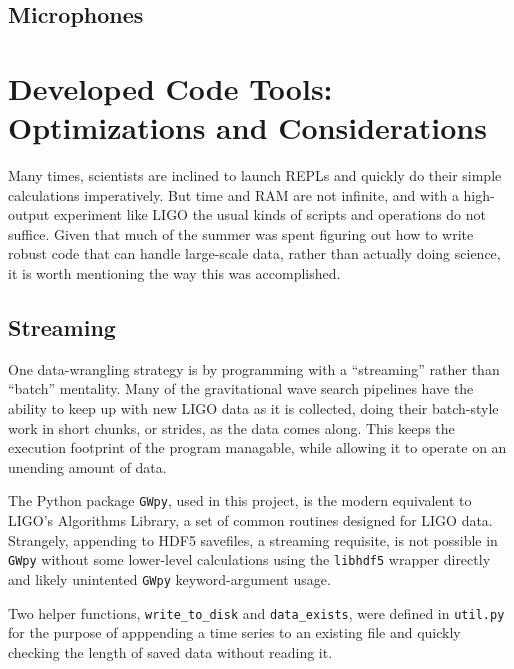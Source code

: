 \documentclass[colorlinks=true,pdfstartview=FitV,linkcolor=blue,
            citecolor=red,urlcolor=magenta]{ligodoc}
\begin{document}
\subsection{Microphones}

\section{Developed Code Tools: Optimizations and Considerations}
Many times, scientists are inclined to launch REPLs and quickly do their simple calculations imperatively.
But time and RAM are not infinite, and with a high-output experiment like LIGO the usual kinds of scripts and operations do not suffice.
Given that much of the summer was spent figuring out how to write robust code that can handle large-scale data, rather than actually doing science, it is worth mentioning the way this was accomplished.

\subsection{Streaming}
One data-wrangling strategy is by programming with a ``streaming'' rather than ``batch'' mentality.
Many of the gravitational wave search pipelines have the ability to keep up with new LIGO data as it is collected, doing their batch-style work in short chunks, or strides, as the data comes along.
This keeps the execution footprint of the program managable, while allowing it to operate on an unending amount of data.

The Python package \texttt{GWpy}, used in this project, is the modern equivalent to LIGO's Algorithms Library, a set of common routines designed for LIGO data.
Strangely, appending to HDF5 savefiles, a streaming requisite, is not possible in \texttt{GWpy} without some lower-level calculations using the \texttt{libhdf5} wrapper directly and likely unintented \texttt{GWpy} keyword-argument usage.

Two helper functions, \texttt{write\_to\_disk} and \texttt{data\_exists}, were defined in \texttt{util.py} for the purpose of apppending a time series to an existing file and quickly checking the length of saved data without reading it.
\end{document}
